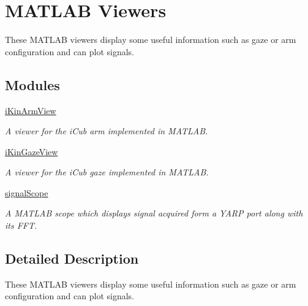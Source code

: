 \section{M\+A\+T\+L\+A\+B Viewers}
\label{group__icub__matlabViewers}


These M\+A\+T\+L\+A\+B viewers display some useful information such as gaze or arm configuration and can plot signals.  


\subsection*{Modules}
\begin{DoxyCompactItemize}
\item 
\hyperlink{group__icub__iKinArmView}{i\+Kin\+Arm\+View}
\begin{DoxyCompactList}\small\item\em A viewer for the i\+Cub arm implemented in M\+A\+T\+L\+A\+B. \end{DoxyCompactList}\item 
\hyperlink{group__icub__iKinGazeView}{i\+Kin\+Gaze\+View}
\begin{DoxyCompactList}\small\item\em A viewer for the i\+Cub gaze implemented in M\+A\+T\+L\+A\+B. \end{DoxyCompactList}\item 
\hyperlink{group__icub__signalScope}{signal\+Scope}
\begin{DoxyCompactList}\small\item\em A M\+A\+T\+L\+A\+B scope which displays signal acquired form a Y\+A\+R\+P port along with its F\+F\+T. \end{DoxyCompactList}\end{DoxyCompactItemize}


\subsection{Detailed Description}
These M\+A\+T\+L\+A\+B viewers display some useful information such as gaze or arm configuration and can plot signals. 

